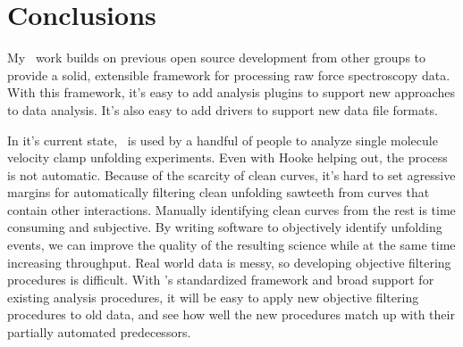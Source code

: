 \section{Conclusions}
\label{sec:hooke:conclusions}

My \Hooke\ work builds on previous open source development from other
groups to provide a solid, extensible framework for processing raw
force spectroscopy data.  With this framework, it's easy to add
analysis plugins to support new approaches to data analysis.  It's
also easy to add drivers to support new data file formats.

In it's current state, \Hooke\ is used by a handful of people to
analyze single molecule velocity clamp unfolding experiments.  Even
with Hooke helping out, the process is not automatic.  Because of the
scarcity of clean curves, it's hard to set agressive margins for
automatically filtering clean unfolding sawteeth from curves that
contain other interactions.  Manually identifying clean curves from
the rest is time consuming and subjective.  By writing software to
objectively identify unfolding events, we can improve the quality of
the resulting science while at the same time increasing throughput.
Real world data is messy, so developing objective filtering procedures
is difficult.  With \Hooke's standardized framework and broad support
for existing analysis procedures, it will be easy to apply new
objective filtering procedures to old data, and see how well the new
procedures match up with their partially automated predecessors.

